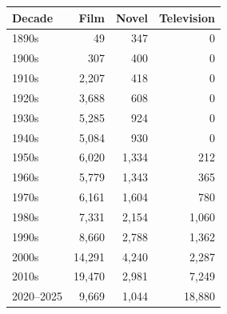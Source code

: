 \begin{tabular}{l r r r}
\toprule
Decade & Film & Novel & Television \\
\midrule
1890s & 49 & 347 & 0 \\
1900s & 307 & 400 & 0 \\
1910s & 2{,}207 & 418 & 0 \\
1920s & 3{,}688 & 608 & 0 \\
1930s & 5{,}285 & 924 & 0 \\
1940s & 5{,}084 & 930 & 0 \\
1950s & 6{,}020 & 1{,}334 & 212 \\
1960s & 5{,}779 & 1{,}343 & 365 \\
1970s & 6{,}161 & 1{,}604 & 780 \\
1980s & 7{,}331 & 2{,}154 & 1{,}060 \\
1990s & 8{,}660 & 2{,}788 & 1{,}362 \\
2000s & 14{,}291 & 4{,}240 & 2{,}287 \\
2010s & 19{,}470 & 2{,}981 & 7{,}249 \\
2020--2025 & 9{,}669 & 1{,}044 & 18{,}880 \\
\bottomrule
\end{tabular}